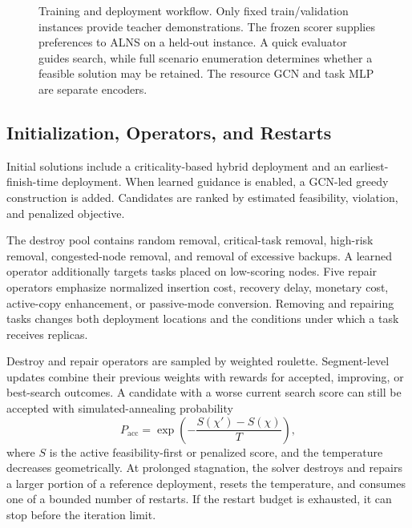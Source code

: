 \begin{figure}[!t]
 \centering
 
 \caption{Training and deployment workflow. Only fixed train/validation
 instances provide teacher demonstrations. The frozen scorer supplies
 preferences to ALNS on a held-out instance. A quick evaluator guides search,
 while full scenario enumeration determines whether a feasible solution may
 be retained. The resource GCN and task MLP are separate encoders.}
 \label{fig:overview}
\end{figure}

\subsection{Initialization, Operators, and Restarts}
Initial solutions include a criticality-based hybrid deployment and an
earliest-finish-time deployment. When learned guidance is enabled, a GCN-led
greedy construction is added. Candidates are ranked by estimated feasibility,
violation, and penalized objective.

The destroy pool contains random removal, critical-task removal, high-risk
removal, congested-node removal, and removal of excessive backups. A learned
operator additionally targets tasks placed on low-scoring nodes. Five repair
operators emphasize normalized insertion cost, recovery delay, monetary cost,
active-copy enhancement, or passive-mode conversion. Removing and repairing
tasks changes both deployment locations and the conditions under which a
task receives replicas.

Destroy and repair operators are sampled by weighted roulette. Segment-level
updates combine their previous weights with rewards for accepted, improving,
or best-search outcomes. A candidate with a worse current search score can
still be accepted with simulated-annealing probability
\begin{equation}
 P_{\mathrm{acc}}=\exp\!\left(-\frac{S(\chi')-S(\chi)}{T}\right),
 \label{eq:sa}
\end{equation}
where $S$ is the active feasibility-first or penalized score, and the
temperature decreases geometrically. At prolonged stagnation, the solver
destroys and repairs a larger portion of a reference deployment, resets the
temperature, and consumes one of a bounded number of restarts. If the restart
budget is exhausted, it can stop before the iteration limit.

